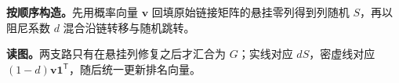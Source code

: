 \documentclass[UTF8,a4paper,11pt,openany]{ctexbook}
\begin{document}
\setcounter{page}{904}
\setcounter{chapter}{36}
\setcounter{section}{2}
\setcounter{figure}{4}
\pagestyle{headings}
\textbf{按顺序构造。}先用概率向量 $\boldsymbol v$ 回填原始链接矩阵的悬挂零列得到列随机 $S$，再以阻尼系数 $d$ 混合沿链转移与随机跳转。

\FloatBarrier
\textbf{读图。}两支路只有在悬挂列修复之后才汇合为 $G$；实线对应 $dS$，密虚线对应 $(1-d)\boldsymbol v\boldsymbol1^{\mathsf T}$，随后统一更新排名向量。
\end{document}
